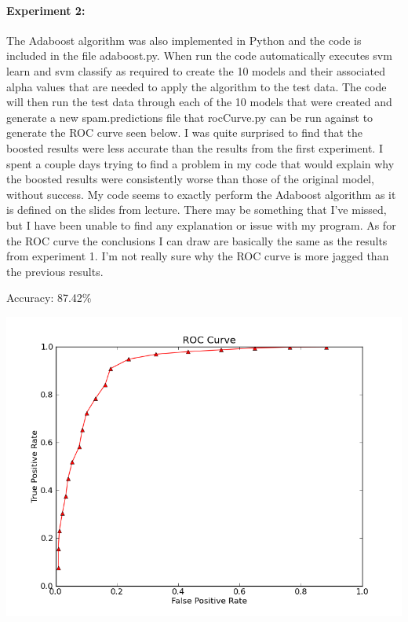 \documentclass[11pt]{article}
\begin{document}
\paragraph{Experiment 2:} The Adaboost algorithm was also implemented in Python and the code is included in the file adaboost.py.  When run the code automatically executes svm learn and svm classify as required to create the 10 models and their associated alpha values that are needed to apply the algorithm to the test data.  The code will then run the test data through each of the 10 models that were created and generate a new spam.predictions file that rocCurve.py can be run against to generate the ROC curve seen below.  I was quite surprised to find that the boosted results were less accurate than the results from the first experiment.  I spent a couple days trying to find a problem in my code that would explain why the boosted results were consistently worse than those of the original model, without success.  My code seems to exactly perform the Adaboost algorithm as it is defined on the slides from lecture.  There may be something that I've missed, but I have been unable to find any explanation or issue with my program.  As for the ROC curve the conclusions I can draw are basically the same as the results from experiment 1.  I'm not really sure why the ROC curve is more jagged than the previous results.
\begin{center}
  Accuracy: 87.42\%
\end{center}

\begin{center}
  \includegraphics[width=6.0in]{q2curve.png}
\end{center}
\end{document}
